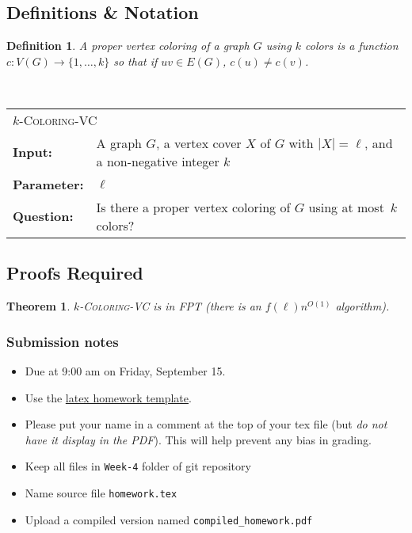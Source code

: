 \documentclass{article}
\newcommand{\defproblem}[4]{%
  \hfill\\\smallskip\noindent%
  \begin{tabularx}{\textwidth}{|l X|}%
    \hline%
    \multicolumn{2}{|l|}{\pname{#1}}\\%
    \textbf{Input:}&#2\\%
    \textbf{Parameter:}&#3\\%
    \textbf{Question:}&#4\smallskip\\\hline%
  \end{tabularx}%
  \smallskip%
}%
\newcommand{\pname}[1]{\textnormal{\textsc{#1}}}
\newtheorem*{theorem}{Theorem}
\newtheorem{definition}{Definition}
\begin{document}
\subsection*{Definitions \& Notation}
\begin{definition}
    A \emph{proper vertex coloring} of a graph $G$ \emph{using $k$ colors}
    is a function $c: V(G) \rightarrow \{1,\ldots, k\}$ so that if $uv \in E(G)$,
    $c(u) \neq c(v)$.
\end{definition}


\defproblem{$k$-Coloring-VC}
%
{A graph $G$, a vertex cover $X$ of $G$ with $|X| = \ell$, and a non-negative integer $k$}
%
{$\ell$}
%
{Is there a proper vertex coloring of $G$ using at most~$k$ colors?}
%


\subsection*{Proofs Required}

\begin{theorem} $k$-\pname{Coloring-VC} is in FPT (there is an $f(\ell)n^{O(1)}$ algorithm).
\end{theorem}


\vfill

\subsubsection*{Submission notes}
\begin{itemize}
\item Due at 9:00 am on Friday, September 15.
\item Use the \href{https://github.com/bdsullivan/ParameterizedAlgorithms-Fall2017/tree/master/templates/homework}{latex homework template}.
\item Please put your name in a comment at the top of your tex file (but {\it do not
have it display in the PDF}). This will help prevent any bias in grading.
\item Keep all files in \texttt{Week-4} folder of git repository
\item Name source file \texttt{homework.tex}
\item Upload a compiled version named \texttt{compiled\_homework.pdf}
\end{itemize}
\end{document}
